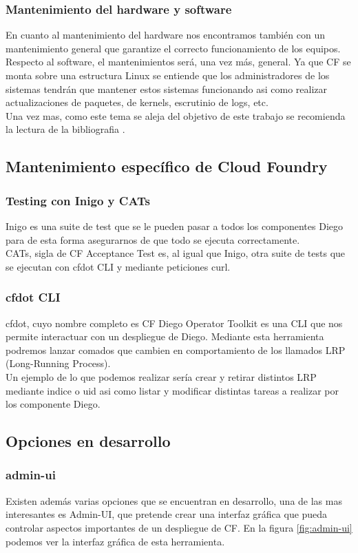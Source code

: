 \documentclass[a4paper,11pt]{article}
\begin{document}
\subsubsection{Mantenimiento del hardware y software}
En cuanto al mantenimiento del hardware nos encontramos también con un mantenimiento general que garantize el correcto funcionamiento de los equipos.\\
Respecto al software, el mantenimientos será, una vez más, general. Ya que CF se monta sobre una estructura Linux se entiende que los administradores de los sistemas tendrán que mantener estos sistemas funcionando asi como realizar actualizaciones de paquetes, de kernels, escrutinio de logs, etc.\\
Una vez mas, como este tema se aleja del objetivo de este trabajo se recomienda la lectura de la bibliografia \cite{redhatSysadminguide}.

\subsection{Mantenimiento específico de Cloud Foundry}
\subsubsection{Testing con Inigo y CATs}
Inigo es una suite de test que se le pueden pasar a todos los componentes Diego para de esta forma asegurarnos de que todo se ejecuta correctamente.\\
CATs, sigla de CF Acceptance Test es, al igual que Inigo, otra suite de tests que se ejecutan con cfdot CLI y mediante peticiones curl.
\subsubsection{cfdot CLI}
cfdot, cuyo nombre completo es CF Diego Operator Toolkit es una CLI que nos permite interactuar con un despliegue de Diego. Mediante esta herramienta podremos lanzar comados que cambien en comportamiento de los llamados LRP (Long-Running Process).\\
Un ejemplo de lo que podemos realizar sería crear y retirar distintos LRP mediante indice o uid asi como listar y modificar distintas tareas a realizar por los componente Diego.

\subsection{Opciones en desarrollo}
\subsubsection{admin-ui}
Existen además varias opciones que se encuentran en desarrollo, una de las mas interesantes es Admin-UI, que pretende crear una interfaz gráfica que pueda controlar aspectos importantes de un despliegue de CF. En la figura \ref{fig:admin-ui} podemos ver la interfaz gráfica de esta herramienta.
\end{document}

